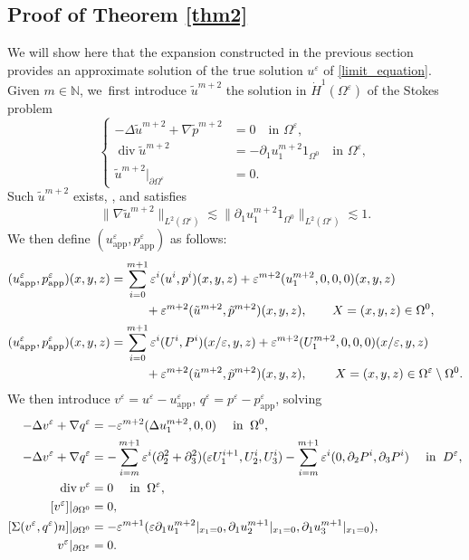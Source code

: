 \documentclass[JEP,XML,SOM,Unicode,NoEqCountersInSection,published]{cedram}
\newcommand{\app}{\mathrm{app}}
\renewcommand{\div}{\operatorname{div}}
\theoremstyle{plain}
\theoremstyle{definition}
\let\pa\partial
\let\na\nabla
\let\eps\varepsilon
\newcommand{\N}{\mathbb{N}}
\begin{document}
\subsection{Proof of Theorem \ref{thm2}}
We will show here that the expansion constructed in the previous section provides an approximate solution of the true solution $u^\eps$ of \eqref{limit_equation}. Given $m \in \N$, we~first introduce $\tilde{u}^{m+2}$ the solution in $\dot{H}^1(\Omega^\eps)$ of the Stokes problem
\begin{equation*}
\left\{
\begin{aligned}
-\Delta \tilde{u}^{m+2} + \na \tilde{p}^{m+2} & = 0 \quad \text{in } \Omega^\eps, \\
\div \tilde{u}^{m+2} & = - \pa_1 u^{m+2}_1 1_{\Omega^0} \quad \text{in } \Omega^\eps, \\
\tilde{u}^{m+2}\vert_{\pa \Omega^\eps} & = 0.
\end{aligned}
\right.
\end{equation*}
Such $\tilde{u}^{m+2}$ exists, \cf \cite[Th.\,IV.3.3]{Galdi}, and satisfies
\[
\|\na \tilde{u}^{m+2}\|_{L^2(\Omega^\eps)} \lesssim \|\pa_1 u^{m+2}_1 1_{\Omega^0} \|_{L^2(\Omega^\eps)} \lesssim 1.
\]
We then define $(u^\eps_{\app}, p^{\eps}_{\app})$ as follows:
\begin{equation*}
\begin{aligned}
(u^\eps_{\app},p^\eps_{\app})(x,y,z) & = \sum_{i=0}^{m+1} \eps^i (u^i, p^i)(x,y,z) + \eps^{m+2} (u^{m+2}_1,0,0,0)(x,y,z) \\
& \hspace*{1cm}+ \eps^{m+2} (\tilde{u}^{m+2},\tilde{p}^{m+2})(x,y,z), \qquad X = (x,y,z) \in \Omega^0, \\
(u^\eps_{\app}, p^\eps_{\app})(x,y,z) & = \sum_{i=0}^{m+1} \eps^i (U^i, P^i)(x/\eps,y,z) + \eps^{m+2} (U^{m+2}_1,0,0,0)(x/\eps,y,z) \\
& \hspace*{1cm}+ \eps^{m+2} (\tilde{u}^{m+2},\tilde{p}^{m+2})(x,y,z), \qquad \: X = (x,y,z) \in \Omega^\eps\setminus\Omega^0.
\end{aligned}
\end{equation*}
We then introduce $v^\eps = u^\eps - u^\eps_{\app}$, $q^\eps = p^\eps - p^\eps_{\app}$, solving
\begin{align}
-\Delta v^\eps + \na q^\eps & = - \eps^{m+2} (\Delta u^{m+2}_1,0,0) \quad \text{ in } \: \Omega^0,\notag \\
-\Delta v^\eps + \na q^\eps & = - \sum_{i=m}^{m+1} \eps^i (\pa^2_2 + \pa^2_3) (\eps U^{i+1}_1,U^i_2,U^i_3) - \sum_{i=m}^{m+1} \eps^i (0, \pa_2 P^i, \pa_3 P^i) \quad \text{ in } \: D^\eps, \notag \\
\div v^\eps & = 0 \quad \text{ in } \: \Omega^\eps, \\
[v^\eps]\vert_{\pa \Omega^0} & = 0, \notag\\
[\Sigma(v^\eps,q^\eps)n]\vert_{\pa \Omega^0} & = - \eps^{m+1}(\eps \pa_1 u^{m+2}_1\vert_{x_1=0},\pa_1 u^{m+1}_2\vert_{x_1=0}, \pa_1 u^{m+1}_3\vert_{x_1=0}), \notag \\
v^\eps \vert_{\pa \Omega^\eps} & = 0. \notag
\end{align}
\end{document}
